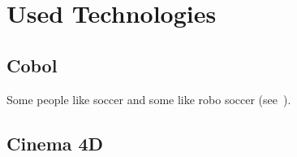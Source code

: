 \chapter{Used Technologies}\label{cha:used-technologies}
\section{Cobol}\label{sec:cobol}
Some people like soccer and some like robo soccer (see~\cite{rofer_roboter-fusball:_2017}).

\section{Cinema 4D}\label{sec:cinema4d}